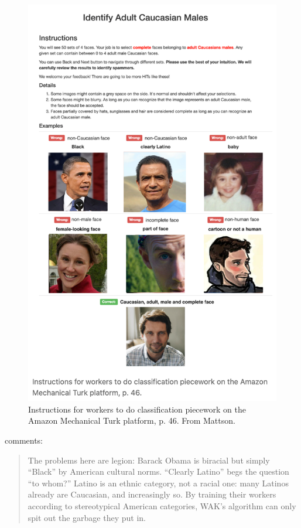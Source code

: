 \documentclass[
]{book}
\begin{document}
\begin{figure}
\includegraphics[width=0.9\linewidth]{figures/gayface_extract} \caption{Instructions for workers to do classification piecework on the Amazon Mechanical Turk platform, p. 46. From Mattson.}\label{fig:mattsonexamplemap}
\end{figure}

\citet{Mattson2017} comments:

\begin{quote}
The problems here are legion: Barack Obama is biracial but simply ``Black'' by American cultural norms. ``Clearly Latino'' begs the question ``to whom?'' Latino is an ethnic category, not a racial one: many Latinos already are Caucasian, and increasingly so. By training their workers according to stereotypical American categories, WAK's algorithm can only spit out the garbage they put in.
\end{quote}
\end{document}

